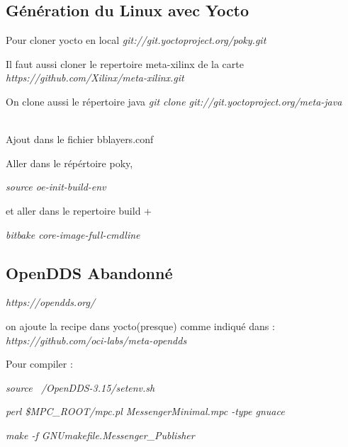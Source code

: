 \subsection{Génération du Linux avec Yocto}
Pour cloner yocto en local
\textit{git://git.yoctoproject.org/poky.git}

Il faut aussi cloner le repertoire meta-xilinx de la carte 
\textit{https://github.com/Xilinx/meta-xilinx.git}

On clone aussi le répertoire java
\textit{git clone git://git.yoctoproject.org/meta-java}

\\

Ajout dans le fichier bblayers.conf
\\



Aller dans le répértoire poky, 

\textit{ source oe-init-build-env}

et aller dans le repertoire build +

\textit{ bitbake core-image-full-cmdline} 
\subsection{OpenDDS   Abandonné}

\textit{https://opendds.org/}

on ajoute la recipe dans yocto(presque) comme indiqué dans :
\textit{https://github.com/oci-labs/meta-opendds}


Pour compiler : 

\textit{
source ~/OpenDDS-3.15/setenv.sh} 

\textit{
perl \$MPC\_ROOT/mpc.pl MessengerMinimal.mpc -type gnuace}

\textit{
make -f GNUmakefile.Messenger_Publisher}


